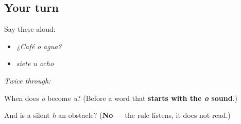 \subsection*{Your turn}
Say these aloud:

\begin{itemize}
\raggedright
  \item \emph{¿Café o agua?}
  \item \emph{siete u ocho}
\end{itemize}

\emph{Twice through:}

\begin{tcolorbox}[breakable,colback=teal!4,colframe=teal!35!black,title={Before you move on}]
When does \emph{o} become \emph{u}? (Before a word that \textbf{starts with the \emph{o} sound}.)

And is a silent \emph{h} an obstacle? (\textbf{No} — the rule listens, it does not read.)
\end{tcolorbox}
